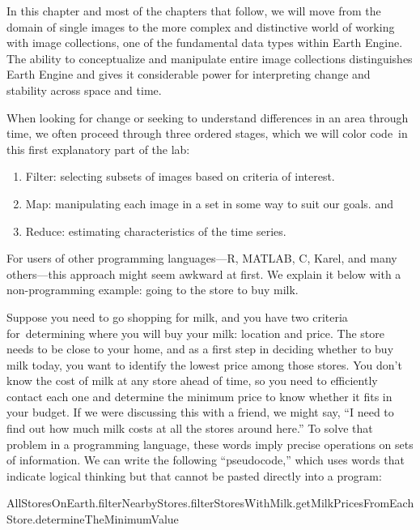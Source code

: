 \documentclass[
  letterpaper,
  DIV=11,
  numbers=noendperiod]{scrreprt}
\providecommand{\tightlist}{%
  \setlength{\itemsep}{0pt}\setlength{\parskip}{0pt}}\usepackage{longtable,booktabs,array}
\begin{document}
In this chapter and most of the chapters that follow, we will move from
the domain of single images to the more complex and distinctive world of
working with image collections, one of the fundamental data types within
Earth Engine. The ability to conceptualize and manipulate entire image
collections distinguishes Earth Engine and gives it considerable power
for interpreting change and stability across space and time.

When looking for change or seeking to understand differences in an area
through time, we often proceed through three ordered stages, which we
will color code~in this first explanatory part of the lab:

\begin{enumerate}
\def\labelenumi{\arabic{enumi}.}
\tightlist
\item
  Filter: selecting subsets of images based on criteria of interest.
\item
  Map: manipulating each image in a set in some way to suit our goals.
  and
\item
  Reduce: estimating characteristics of the time series.
\end{enumerate}

For users of other programming languages---R, MATLAB, C, Karel, and many
others---this approach might seem awkward at first. We explain it below
with a non-programming example: going to the store to buy milk.

Suppose you need to go shopping for milk, and you have two criteria
for~determining where you will buy your milk: location and price. The
store needs to be close to your home, and as a first step in deciding
whether to buy milk today, you want to identify the lowest price among
those stores. You don't know the cost of milk at any store ahead of
time, so you need to efficiently contact each one and determine the
minimum price to know whether it fits in your budget. If we were
discussing this with a friend, we might say, ``I need to find out how
much milk costs at all the stores around here.'' To solve that problem
in a programming language, these words imply precise operations on sets
of information. We can write the following ``pseudocode,'' which uses
words that indicate logical thinking but that cannot be pasted directly
into a program:

AllStoresOnEarth.filterNearbyStores.filterStoresWithMilk.getMilkPricesFromEachStore.determineTheMinimumValue
\end{document}
